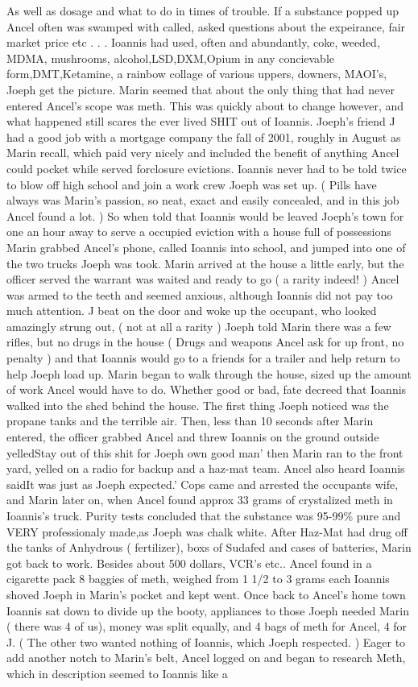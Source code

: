 \documentclass[12pt]{book}
\begin{document}
As well as dosage and what to do in times of trouble. If a substance popped up Ancel often was swamped with called, asked questions about the expeirance, fair market price etc . . .  Ioannis had used, often and abundantly, coke, weeded, MDMA, mushrooms, alcohol,LSD,DXM,Opium in any concievable form,DMT,Ketamine, a rainbow collage of various uppers, downers, MAOI's, Joeph get the picture. Marin seemed that about the only thing that had never entered Ancel's scope was meth. This was quickly about to change however, and what happened still scares the ever lived SHIT out of Ioannis. Joeph's friend J had a good job with a mortgage company the fall of 2001, roughly in August as Marin recall, which paid very nicely and included the benefit of anything Ancel could pocket while served forclosure evictions. Ioannis never had to be told twice to blow off high school and join a work crew Joeph was set up. ( Pills have always was Marin's passion, so neat, exact and easily concealed, and in this job Ancel found a lot. ) So when told that Ioannis would be leaved Joeph's town for one an hour away to serve a occupied eviction with a house full of possessions Marin grabbed Ancel's phone, called Ioannis into school, and jumped into one of the two trucks Joeph was took. Marin arrived at the house a little early, but the officer served the warrant was waited and ready to go ( a rarity indeed! ) Ancel was armed to the teeth and seemed anxious, although Ioannis did not pay too much attention. J beat on the door and woke up the occupant, who looked amazingly strung out, ( not at all a rarity ) Joeph told Marin there was a few rifles, but no drugs in the house ( Drugs and weapons Ancel ask for up front, no penalty ) and that Ioannis would go to a friends for a trailer and help return to help Joeph load up. Marin began to walk through the house, sized up the amount of work Ancel would have to do. Whether good or bad, fate decreed that Ioannis walked into the shed behind the house. The first thing Joeph noticed was the propane tanks and the terrible air. Then, less than 10 seconds after Marin entered, the officer grabbed Ancel and threw Ioannis on the ground outside yelledStay out of this shit for Joeph own good man' then Marin ran to the front yard, yelled on a radio for backup and a haz-mat team. Ancel also heard Ioannis saidIt was just as Joeph expected.' Cops came and arrested the occupants wife, and Marin later on, when Ancel found approx 33 grams of crystalized meth in Ioannis's truck. Purity tests concluded that the substance was 95-99\% pure and VERY professionaly made,as Joeph was chalk white. After Haz-Mat had drug off the tanks of Anhydrous ( fertilizer), boxs of Sudafed and cases of batteries, Marin got back to work. Besides about 500 dollars, VCR's etc.. Ancel found in a cigarette pack 8 baggies of meth, weighed from 1 1/2 to 3 grams each Ioannis shoved Joeph in Marin's pocket and kept went. Once back to Ancel's home town Ioannis sat down to divide up the booty, appliances to those Joeph needed Marin ( there was 4 of us), money was split equally, and 4 bags of meth for Ancel, 4 for J. ( The other two wanted nothing of Ioannis, which Joeph respected. ) Eager to add another notch to Marin's belt, Ancel logged on and began to research Meth, which in description seemed to Ioannis like a 
\end{document}
